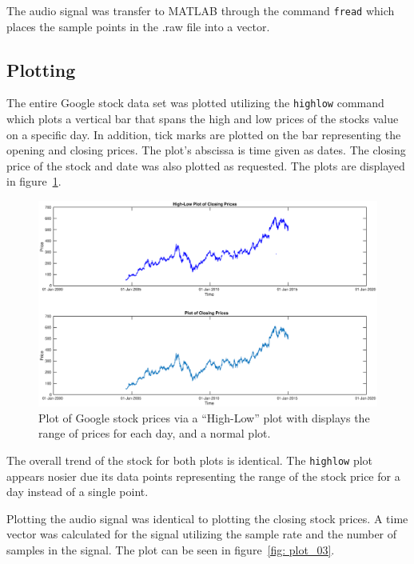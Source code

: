 \documentclass[11pt]{article}
\begin{document}
The audio signal was transfer to MATLAB through the command \verb|fread| which places the sample points in the .raw file into a vector.

\subsection{Plotting} 
 The entire Google stock data set was plotted utilizing the \verb|highlow| command which plots a vertical bar that spans the high and low prices of the stocks value on a specific day. In addition, tick marks are plotted on the bar representing the opening and closing prices. The plot's abscissa is time given as dates. The closing price of the stock and date was also plotted as requested. The plots are displayed in figure~\ref{fig: plot_01}.

\begin{figure}[H] %
	\centering 
	\includegraphics[width=\linewidth]{plot_01}
	\caption{Plot of Google stock prices via a ``High-Low'' plot with displays the range of prices for each day, and a normal plot.}
	\label{fig: plot_01} 
\end{figure}

The overall trend of the stock for both plots is identical. The \verb|highlow| plot appears nosier due its data points representing the range of the stock price for a day instead of a single point. 

Plotting the audio signal was identical to plotting the closing stock prices. A time vector was calculated for the signal utilizing the sample rate and the number of samples in the signal. The plot can be seen in figure~\ref{fig: plot_03}. 
\end{document}
